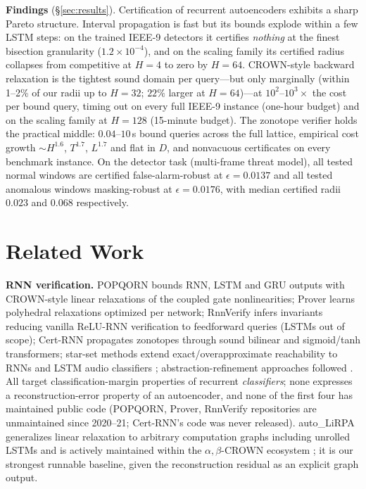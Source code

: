 \documentclass{article} %
\begin{document}
\textbf{Findings} (\S\ref{sec:results}). Certification of recurrent
autoencoders exhibits a sharp Pareto structure. Interval propagation is
fast but its bounds explode within a few LSTM steps: on the trained
IEEE-9 detectors it certifies \emph{nothing} at the finest bisection
granularity ($1.2\times10^{-4}$), and on the scaling family its
certified radius collapses from competitive at $H{=}4$ to zero by
$H{=}64$. CROWN-style backward relaxation is the tightest sound domain
per query---but only marginally (within 1--2\% of our radii up to
$H{=}32$; $22\%$ larger at $H{=}64$)---at $10^2$--$10^3\times$ the cost
per bound query, timing out on every full IEEE-9 instance (one-hour
budget) and on the scaling family at $H{=}128$ (15-minute budget). The
zonotope verifier holds the practical middle: $0.04$--$10$\,s bound
queries across the full lattice, empirical cost growth
$\sim\!H^{1.6}$, $T^{1.7}$, $L^{1.7}$ and flat in $D$, and nonvacuous
certificates on every benchmark instance. On the detector task
(multi-frame threat model), all tested normal windows are certified
false-alarm-robust at $\epsilon = 0.0137$ and all tested anomalous
windows masking-robust at $\epsilon = 0.0176$, with median certified
radii $0.023$ and $0.068$ respectively.

\section{Related Work}
\label{sec:related}

\textbf{RNN verification.} POPQORN \citep{ko2019popqorn} bounds RNN,
LSTM and GRU outputs with CROWN-style linear relaxations of the coupled
gate nonlinearities; Prover \citep{ryou2021scalable} learns
polyhedral relaxations optimized per network; RnnVerify
\citep{jacoby2020rnnverify} infers invariants reducing vanilla ReLU-RNN
verification to feedforward queries (LSTMs out of scope); Cert-RNN
\citep{du2021certrnn} propagates zonotopes through sound bilinear and
sigmoid/tanh transformers; star-set methods extend exact/overapproximate
reachability to RNNs and LSTM audio classifiers
\citep{tran2023star,pal2023lstmstar}; abstraction-refinement approaches
followed \citep{lin2026refine}. All target
classification-margin properties of recurrent \emph{classifiers}; none
expresses a reconstruction-error property of an autoencoder, and none of
the first four has maintained public code (POPQORN, Prover, RnnVerify
repositories are unmaintained since 2020--21; Cert-RNN's code was never
released). auto\_LiRPA \citep{xu2020automatic} generalizes linear
relaxation to arbitrary computation graphs including unrolled LSTMs and
is actively maintained within the $\alpha,\beta$-CROWN ecosystem
\citep{wang2021beta,shi2024genbab}; it is our strongest runnable
baseline, given the reconstruction residual as an explicit graph output.
\end{document}
